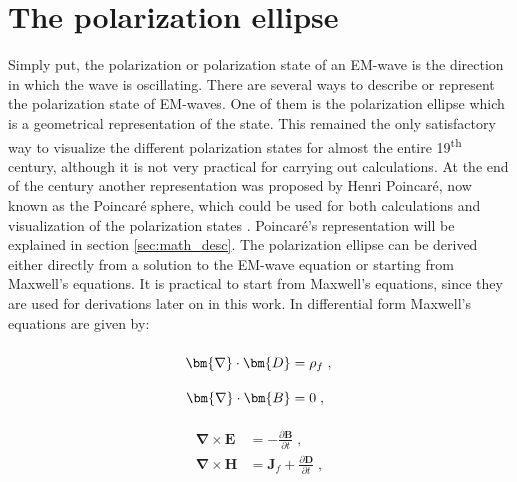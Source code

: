 \section{The polarization ellipse}
\label{sec:polellipse}
Simply put, the polarization or polarization state of an EM-wave is the direction in which the wave is oscillating. There are several ways to describe or represent the polarization state of EM-waves. One of them is the polarization ellipse which is a geometrical representation of the state. This remained the only satisfactory way to visualize the different polarization states for almost the entire 19\textsuperscript{th} century, although it is not very practical for carrying out calculations. At the end of the century another representation was proposed by Henri Poincaré, now known as the Poincaré sphere, which could be used for both calculations and visualization of the polarization states \cite{Collett2008a}. Poincaré's representation will be explained in section \ref{sec:math_desc}. The polarization ellipse can be derived either directly from a solution to the EM-wave equation or starting from Maxwell's equations.  It is practical to start from Maxwell's equations, since they are used for derivations later on in this work. In differential form Maxwell's equations are given by:
\par
\noindent\begin{minipage}{.5\linewidth}
\begin{align}
    \bm{\nabla}\cdot\bm{D} &=\rho_{f}\;,\label{eq:maxwell1}
    \vphantom{\frac{\partial\bm{B}}{\partial t}}\\
    \bm{\nabla}\cdot\bm{B} &=0\;,\vphantom{\frac{\partial\bm{B}}{\partial t}}\label{eq:maxwell2}
\end{align}
\end{minipage}%
\begin{minipage}{.5\linewidth}
\begin{align}
    \bm{\nabla}\times\bm{E} &=-\frac{\partial\bm{B}}{\partial t}\;,\label{eq:maxwell3}
    \\
    \bm{\nabla}\times\bm{H} &=\bm{J}_f
    +\frac{\partial\bm{D}}{\partial t}\;,\label{eq:maxwell4}
\end{align}
\end{minipage}
\newline

